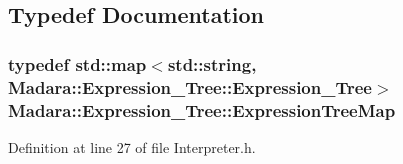 \subsection{Typedef Documentation}
\hypertarget{namespaceMadara_1_1Expression__Tree_a788e8f51bae001516b9aec802d9decf5}{
\subsubsection[{ExpressionTreeMap}]{\setlength{\rightskip}{0pt plus 5cm}typedef std::map$<$std::string, {\bf Madara::Expression\_\-Tree::Expression\_\-Tree}$>$ {\bf Madara::Expression\_\-Tree::ExpressionTreeMap}}}
\label{df/d66/namespaceMadara_1_1Expression__Tree_a788e8f51bae001516b9aec802d9decf5}


Definition at line 27 of file Interpreter.h.



